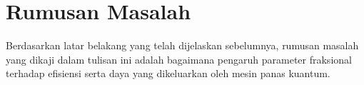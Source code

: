 
\section{Rumusan Masalah}
Berdasarkan latar belakang yang telah dijelaskan sebelumnya, rumusan masalah yang dikaji dalam tulisan ini adalah bagaimana pengaruh parameter fraksional terhadap efisiensi serta daya yang dikeluarkan oleh mesin panas kuantum.


